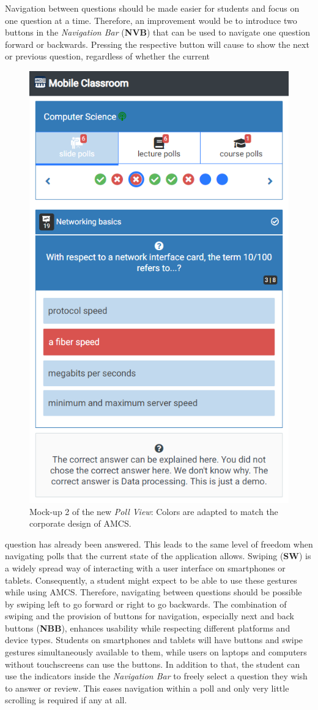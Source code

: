 Navigation between questions should be made easier for students and focus on one question at a time. Therefore, an improvement would be to introduce two buttons in the \emph{Navigation Bar} (\textbf{NVB}) that can be used to navigate one question forward or backwards. Pressing the respective button will cause to show the next or previous question, regardless of whether the current 
\begin{figure}
	\vspace*{-0.5cm}
	\begin{center}
		\includegraphics[width=.48\textwidth]{mockups/poll_view_enhancement_v2.png}
	\end{center}
	\captionsetup{width=.8\linewidth}
	\captionsetup{format=plain}
	\caption{Mock-up 2 of the new \emph{Poll View}:
		Colors are adapted to match the corporate design of AMCS.
	}
	\label{figure:pollviewenhanvement2}
	\vspace*{-0.75cm}
\end{figure}
question has already been answered. This leads to the same level of freedom when navigating polls that the current state of the application allows. 
Swiping (\textbf{SW}) is a widely spread way of interacting with a user interface on smartphones or tablets. Consequently, a student might expect to be able to use these gestures while using AMCS. Therefore, navigating between questions should be possible by swiping left to go forward or right to go backwards. The combination of swiping and the provision of buttons for navigation, especially next and back buttons (\textbf{NBB}), enhances usability while respecting different platforms and device types.
Students on smartphones and tablets will have buttons and swipe gestures simultaneously available to them, while users on laptops and computers without touchscreens can use the buttons.
In addition to that, the student can use the indicators inside the \emph{Navigation Bar} to freely select a question they wish to answer or review. This eases navigation within a poll and only very little scrolling is required if any at all.


